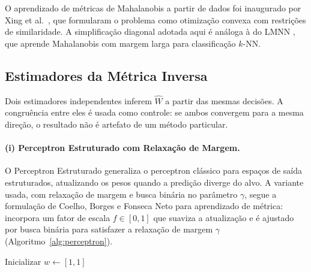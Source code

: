 \documentclass[12pt,a4paper]{article}
\newcommand{\West}{\ensuremath{\hat{W}}}   %
\begin{document}
O aprendizado de métricas de Mahalanobis a partir de dados foi inaugurado por Xing et
al.~\cite{xingDistanceMetric2002}, que formularam o problema como otimização convexa com
restrições de similaridade. A simplificação diagonal adotada aqui é análoga à do LMNN
\cite{weinbergerDistanceMetric2009}, que
aprende Mahalanobis com margem larga para classificação $k$-NN.

\subsection{Estimadores da Métrica Inversa}

Dois estimadores independentes inferem \West{} a partir das mesmas decisões. A congruência
entre eles é usada como controle: se ambos convergem para a mesma direção, o resultado não
é artefato de um método particular.

\paragraph{(i) Perceptron Estruturado com Relaxação de Margem.}
O Perceptron Estruturado \cite{collinsDiscriminativeTraining2002} generaliza o perceptron
clássico para espaços de saída estruturados, atualizando os pesos quando a predição diverge
do alvo. A variante usada, com relaxação de margem e busca binária no parâmetro $\gamma$,
segue a formulação de Coelho, Borges e Fonseca Neto \cite{coelhoPredicaoEstruturada2017}
para aprendizado de métrica: incorpora um fator de escala $f \in [0,1]$ que suaviza a
atualização e é ajustado por busca binária para satisfazer a relaxação de margem $\gamma$
(Algoritmo~\ref{alg:perceptron}).

\begin{algorithm}[ht]
\DontPrintSemicolon
{}
Inicializar $w \leftarrow [1, 1]$\;
\caption{Perceptron Estruturado com Relaxação de Margem (variante diagonal)}
\label{alg:perceptron}
\end{algorithm}
\end{document}

